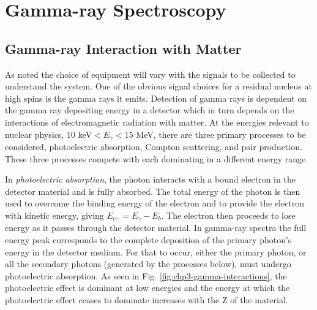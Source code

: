 \section{Gamma-ray Spectroscopy}
\label{sec:exp-pr-gamma-spec}
\subsection{Gamma-ray Interaction with Matter}
\label{ssec:exp-pr-gamma-spec-interactions}
As noted the choice of equipment will vary with the signals to be collected to understand the system. One of the obvious signal choices for a residual nucleus at high spins is the gamma rays it emits. Detection of gamma rays is dependent on the gamma ray depositing energy in a detector which in turn depends on the interactions of electromagnetic radiation with matter. At the energies relevant to nuclear physics, $10$ keV$<E_{\gamma}<15$ MeV, there are three primary processes to be considered, photoelectric absorption, Compton scattering, and pair production. These three processes compete with each dominating in a different energy range.

In \emph{photoelectric absorption}, the photon interacts with a bound electron in the detector material and is fully absorbed\cite{einstein-PE}. The total energy of the photon is then used to overcome the binding energy of the electron and to provide the electron with kinetic energy, giving $E_{e^-}=E_{\gamma}-E_b$. The electron then proceeds to lose energy as it passes through the detector material. In gamma-ray spectra the full energy peak corresponds to the complete deposition of the primary photon's energy in the detector medium. For that to occur, either the primary photon, or all the secondary photons (generated by the processes below), must undergo photoelectric absorption. As seen in Fig. \ref{fig:chp3-gamma-interactions}, the photoelectric effect is dominant at low energies and the energy at which the photoelectric effect ceases to dominate increases with the Z of the material.

